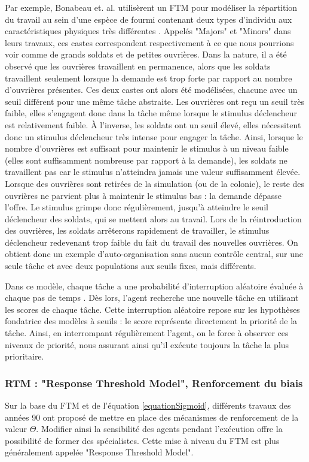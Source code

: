         Par exemple, Bonabeau et. al. \cite{bonabeau_quantitative_1996} utilisèrent un FTM pour modéliser la répartition du travail au sein d'une espèce de fourmi contenant deux types d'individu aux caractéristiques physiques très différentes \cite{wilson_relation_1984}. Appelés "Majors" et "Minors" dans leurs travaux, ces castes correspondent respectivement à ce que nous pourrions voir comme de grands soldats et de petites ouvrières. Dans la nature, il a été observé que les ouvrières travaillent en permanence, alors que les soldats travaillent seulement lorsque la demande est trop forte par rapport au nombre d'ouvrières présentes. Ces deux castes ont alors été modélisées, chacune avec un seuil différent pour une même tâche abstraite. 
        Les ouvrières ont reçu un seuil très faible, elles s'engagent donc dans la tâche même lorsque le stimulus déclencheur est relativement faible. À l'inverse, les soldats ont un seuil élevé, elles nécessitent donc un stimulus déclencheur très intense pour engager la tâche. Ainsi, lorsque le nombre d'ouvrières est suffisant pour maintenir le stimulus à un niveau faible (elles sont suffisamment nombreuse par rapport à la demande), les soldats ne travaillent pas car le stimulus n'atteindra jamais une valeur suffisamment élevée. Lorsque des ouvrières sont retirées de la simulation (ou de la colonie), le reste des ouvrières ne parvient plus à maintenir le stimulus bas : la demande dépasse l'offre. Le stimulus grimpe donc régulièrement, jusqu'à atteindre le seuil déclencheur des soldats, qui se mettent alors au travail. Lors de la réintroduction des ouvrières, les soldats arrêterons rapidement de travailler, le stimulus déclencheur redevenant trop faible du fait du travail des nouvelles ouvrières. On obtient donc un exemple d'auto-organisation sans aucun contrôle central, sur une seule tâche et avec deux populations aux seuils fixes, mais différents.
		
		Dans ce modèle, chaque tâche a une probabilité d'interruption aléatoire évaluée à chaque pas de temps \cite{gautrais_emergent_2002}. Dès lors, l'agent recherche une nouvelle tâche en utilisant les scores de chaque tâche. Cette interruption aléatoire repose sur les hypothèses fondatrice des modèles à seuils : le score représente directement la priorité de la tâche. Ainsi, en interrompant régulièrement l'agent, on le force à observer ces niveaux de priorité, nous assurant ainsi qu'il exécute toujours la tâche la plus prioritaire.
        
        \subsubsection{RTM : "Response Threshold Model", Renforcement du biais}
        Sur la base du FTM et de l'équation \ref{equationSigmoid}, différents travaux des années 90 \cite{theraulaz_response_1998,carbonell_multi-agent_1994, gautrais_emergent_2002} ont proposé de mettre en place des mécanismes de renforcement de la valeur $\Theta$. Modifier ainsi la sensibilité des agents pendant l'exécution offre la possibilité de former des spécialistes. Cette mise à niveau du FTM est plus généralement appelée "Response Threshold Model".
        
